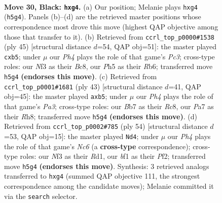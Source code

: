 \documentclass[11pt]{article}
\begin{document}
\clearpage

\begin{figure}[p]\centering
\begin{subfigure}{0.46\textwidth}\centering
\resizebox{\linewidth}{!}{%
\newchessgame
\chessboard[
  setfen={1r1r4/pb1p1pk1/8/2R1p2p/6P1/5n1P/PP3P2/2BK1B1R b - - 0 30},
  showmover=false,
  pgfstyle=straightmove, color=movearrow, markmove={h5-g4}
]}
\caption{}
\end{subfigure}\hfill
\begin{subfigure}{0.46\textwidth}\centering
\resizebox{\linewidth}{!}{%
\newchessgame
\chessboard[
  setfen={2b2rk1/7p/1rp2np1/pP6/8/2P1R3/1P1NB1PP/3R2K1 b - - 0 23},
  showmover=false,
  pgfstyle=straightmove, color=movearrow, markmove={c6-b5}
]}
\caption{}
\end{subfigure}
\\[4pt]
\begin{subfigure}{0.46\textwidth}\centering
\resizebox{\linewidth}{!}{%
\newchessgame
\chessboard[
  setfen={2r4r/4kppp/p7/1P6/8/P3P3/2b3PP/R3KB1R b K - 3 22},
  showmover=false,
  pgfstyle=straightmove, color=movearrow, markmove={a6-b5}
]}
\caption{}
\end{subfigure}\hfill
\begin{subfigure}{0.46\textwidth}\centering
\resizebox{\linewidth}{!}{%
\newchessgame
\chessboard[
  setfen={2r3k1/1r3p2/1bN1pp2/2p4p/P7/1P3P2/5P1P/2RR2K1 w - - 2 28},
  showmover=false,
  pgfstyle=straightmove, color=movearrow, markmove={c6-d4}
]}
\caption{}
\end{subfigure}
\caption{\textbf{Move 30, Black: \texttt{hxg4}.} (a) Our position; Melanie plays \texttt{hxg4} (\texttt{h5g4}). Panels (b)--(d) are the retrieved master positions whose correspondence most drove this move (highest QAP objective among those that transfer to it). (b) Retrieved from \texttt{ccrl\_top\_p0000\#1538} (ply 45) [structural distance $d$=54, QAP obj=51]: the master played \texttt{cxb5}; under $\mu$ our \emph{Ph4} plays the role of that game's \emph{Pc3}; cross-type roles: our \emph{N}f3 as their \emph{B}c8, our \emph{P}h5 as their \emph{R}b6; transferred move \texttt{h5g4} \textbf{(endorses this move)}. (c) Retrieved from \texttt{ccrl\_top\_p0001\#1681} (ply 43) [structural distance $d$=41, QAP obj=45]: the master played \texttt{axb5}; under $\mu$ our \emph{Ph4} plays the role of that game's \emph{Pa3}; cross-type roles: our \emph{B}b7 as their \emph{R}c8, our \emph{P}a7 as their \emph{R}h8; transferred move \texttt{h5g4} \textbf{(endorses this move)}. (d) Retrieved from \texttt{ccrl\_top\_p0002\#785} (ply 54) [structural distance $d$=53, QAP obj=15]: the master played \texttt{Nd4}; under $\mu$ our \emph{Ph4} plays the role of that game's \emph{Nc6} (a \textbf{cross-type} correspondence); cross-type roles: our \emph{N}f3 as their \emph{R}d1, our \emph{b}f1 as their \emph{P}f2; transferred move \texttt{h5g4} \textbf{(endorses this move)}. Synthesis: 3 retrieved analogs transferred to \texttt{hxg4} (summed QAP objective 111, the strongest correspondence among the candidate moves); Melanie committed it via the \texttt{search} selector.}
\label{fig:thought-m59}
\end{figure}
\end{document}
